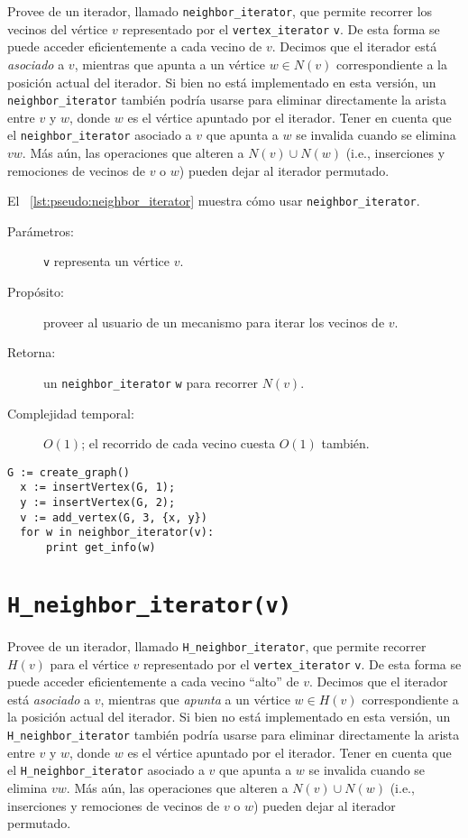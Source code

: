 \documentclass[%
    a4paper,%
    fontsize=12pt,%
    DIV=12,
    twoside,%
    openright,%
    titlepage=true,%
    headsepline,%
    toc=bibliography,%
    parskip=half,%
    cleardoublepage=empty,%
    headings=big,%
]{scrbook}
\makeatletter
\newcommand{\Code}[1]{\lstinline[basicstyle={\ttfamily}]@#1@}
\makeatother
\begin{document}
Provee de un iterador, llamado \Code{neighbor_iterator}, que permite recorrer los vecinos del vértice $v$ representado por el \Code{vertex_iterator} \Code{v}.  De esta forma se puede acceder eficientemente a cada vecino de $v$.  Decimos que el iterador está \emph{asociado} a $v$, mientras que apunta a un vértice $w \in N(v)$ correspondiente a la posición actual del iterador.  Si bien no está implementado en esta versión, un \Code{neighbor_iterator} también podría usarse para eliminar directamente la arista entre $v$ y $w$, donde $w$ es el vértice apuntado por el iterador.  Tener en cuenta que el \Code{neighbor_iterator} asociado a $v$ que apunta a $w$ se invalida cuando se elimina $vw$.  Más aún, las operaciones que alteren a $N(v) \cup N(w)$ (i.e., inserciones y remociones de vecinos de $v$ o $w$) pueden dejar al iterador permutado.

El \lstlistingname~\ref{lst:pseudo:neighbor_iterator} muestra cómo usar \Code{neighbor_iterator}.

\begin{description}
  \item [Parámetros:] \Code{v} representa un vértice $v$.
  \item [Propósito:] proveer al usuario de un mecanismo para iterar los vecinos de $v$.
  \item [Retorna:] un \Code{neighbor_iterator} \Code{w} para recorrer $N(v)$.
  \item [Complejidad temporal:] $O(1)$; el recorrido de cada vecino cuesta $O(1)$ también.
\end{description}


\begin{lstlisting}[caption={Ejemplo de uso de \Code{neighbor_iterator} para imprimir un permutación de 1,2.},gobble=2,float=ht,label={lst:pseudo:neighbor_iterator},emph={neighbor_iterator}]
  G := create_graph()
  x := insertVertex(G, 1);
  y := insertVertex(G, 2);
  v := add_vertex(G, 3, {x, y})
  for w in neighbor_iterator(v):
      print get_info(w)
\end{lstlisting}


\section{\texorpdfstring{\Code{H_neighbor_iterator(v)}}{H\_neighbor\_iterator(v)}}%
\label{sec:tad grafo:H-neighbors}

Provee de un iterador, llamado \Code{H_neighbor_iterator}, que permite recorrer $H(v)$ para el vértice $v$ representado por el \Code{vertex_iterator} \Code{v}.  De esta forma se puede acceder eficientemente a cada vecino ``alto'' de $v$.  Decimos que el iterador está \emph{asociado} a $v$, mientras que \emph{apunta} a un vértice $w \in H(v)$ correspondiente a la posición actual del iterador.  Si bien no está implementado en esta versión, un \Code{H_neighbor_iterator} también podría usarse para eliminar directamente la arista entre $v$ y $w$, donde $w$ es el vértice apuntado por el iterador.  Tener en cuenta que el \Code{H_neighbor_iterator} asociado a $v$ que apunta a $w$ se invalida cuando se elimina $vw$.  Más aún, las operaciones que alteren a $N(v) \cup N(w)$ (i.e., inserciones y remociones de vecinos de $v$ o $w$) pueden dejar al iterador permutado.
\end{document}
